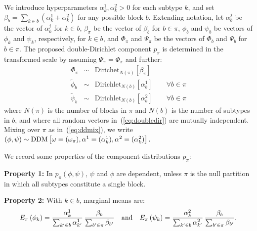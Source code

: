 \documentclass[aoas,preprint]{imsart}
\begin{document}
We introduce hyperparameters
$\alpha^1_k, \alpha^2_k>0$ for each subtype $k$, and set 
$\beta_b = \sum_{k \in b}\left( \alpha^1_k + \alpha^2_k \right)$ for any possible block $b$.
Extending notation, let $\alpha_b^j$ be the vector of $\alpha_k^j$
for $k\in b$, $\beta_\pi$ be the vector of $\beta_b$ for $b \in \pi$, $\phi_b$ and $\psi_b$ be vectors
of $\phi_k$ and $\psi_k$, respectively, for $k\in b$, and $\Phi_\pi$ and $\Psi_\pi$ be the vectors
of $\Phi_b$ and $\Psi_b$ for $b \in \pi$.  The proposed double-Dirichlet component 
$p_\pi$ is determined in the transformed scale by assuming $\Psi_\pi = \Phi_\pi$ and further:
\begin{eqnarray}
\label{eq:doubledir}
\Phi_\pi  &\sim& \text{Dirichet}_{N(\pi)}[   \beta_\pi   ]  \\ \nonumber
\tilde \phi_b  &\sim & \text{Dirichlet}_{N(b)}[ \alpha_b^1 ] \qquad \forall b \in \pi \\ \nonumber
\tilde \psi_b  &\sim & \text{Dirichlet}_{N(b)}[ \alpha_b^2 ] \qquad \forall b \in \pi 
\end{eqnarray}
where $N(\pi)$ is the number of blocks in $\pi$ and $N(b)$ is the number of subtypes in $b$, and
where all random vectors in~(\ref{eq:doubledir}) are mutually independent.  
Mixing over $\pi$ as in~(\ref{eq:ddmix}), we write
$(\phi,\psi) \sim {\mbox {\rm DDM}}\left[ \omega=(\omega_\pi),
\alpha^1=(\alpha^1_k), \alpha^2 = (\alpha^2_k) \right].$


We record some properties of the component distributions $p_\pi$:

\noindent
{\bf Property 1:}  In $p_\pi(\phi,\psi)$, $\psi$ and $\phi$ are dependent, unless $\pi$ is the null 
partition in which all subtypes constitute a single block.


\noindent
{\bf Property 2:} With $k \in b$, marginal means are:
\begin{eqnarray*}
E_\pi\left( \phi_k \right ) = \frac{ \alpha^1_k }{ \sum_{k' \in b} \alpha^1_{k'} } \,
		\frac{ \beta_b }{ \sum_{b' \in \pi} \beta_{b'} } \quad {\mbox {\rm and}} \quad
E_\pi\left( \psi_k \right ) = \frac{ \alpha^2_k }{ \sum_{k' \in b} \alpha^2_{k'} }  \,
		\frac{ \beta_b }{ \sum_{b' \in \pi} \beta_{b'} } .
\end{eqnarray*}
\end{document}
